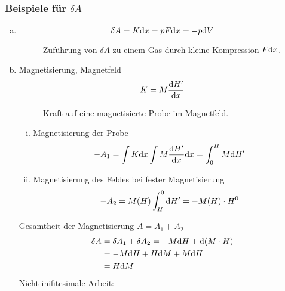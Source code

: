\subsubsection{Beispiele für $\delta A$}
\begin{enumerate}[a)]
    \item
    \begin{equation}
        \delta A = K \mathrm{d} x = p F \mathrm{d} x = - p \mathrm{d} V
    \end{equation}
      
    \begin{figure}[H]
        \centering
        \def\svgwidth{0.4\textwidth}
        
        \caption{Zuführung von $\delta A$ zu einem Gas durch kleine Kompression $F \mathrm{d} x$.}
        \label{img:exampleDApiston}
    \end{figure}
    
    \item Magnetisierung, Magnetfeld
    \begin{equation}
        K = M \frac{\mathrm{d} H'}{\mathrm{d} x}
    \end{equation}
     
    \begin{figure}[H]
        \centering
        \def\svgwidth{0.4\textwidth}
        
        \caption{Kraft auf eine magnetisierte Probe im Magnetfeld.}
        \label{img:exampleDAmagnetism}
    \end{figure}
    
    \begin{enumerate}[i)]
        \item Magnetisierung der Probe
        \begin{equation}
            -A_1 = \int K \mathrm{d} x \int M \frac{\mathrm{d} H'}{\mathrm{d} x} \mathrm{d} x = \int_{0}^{H} M \mathrm{d} H'
        \end{equation}
        \item Magnetisierung des Feldes bei fester Magnetisierung
        \begin{equation}
            - A_2 = M(H) \int_{H}^{0} \mathrm{d} H' = - M(H) \cdot H^0
        \end{equation}
    \end{enumerate}
    Gesamtheit der Magnetisierung $A = A_1 + A_2$
    \begin{equation}
        \begin{split}
            \delta A &= \delta A_1 + \delta A_2 = - M \mathrm{d} H + \mathrm{d}(M \cdot H) \\
            &= - M \mathrm{d} H + H \mathrm{d} M + M \mathrm{d} H \\
            &= H \mathrm{d} M
        \end{split}
    \end{equation}
    Nicht-inifitesimale Arbeit:
      

\end{enumerate}
